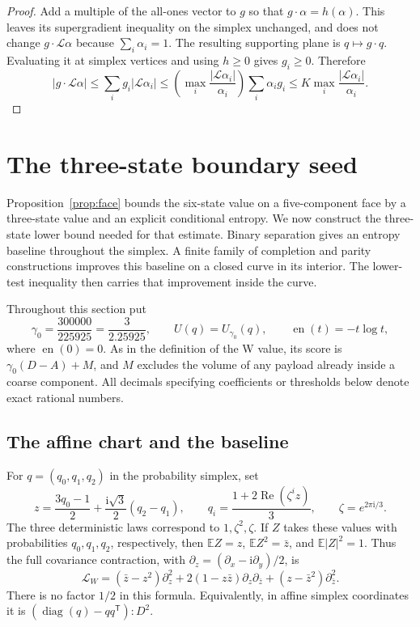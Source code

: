 \documentclass[11pt]{article}
\numberwithin{equation}{section}
\theoremstyle{definition}
\theoremstyle{remark}
\begin{document}
\begin{proof}
Add a multiple of the all-ones vector to \(g\) so that
\(g\cdot\alpha=h(\alpha)\).  This leaves its supergradient inequality
on the simplex unchanged, and does not change \(g\cdot\mathcal L\alpha\)
because \(\sum_i\alpha_i=1\).  The resulting supporting plane is
\(q\mapsto g\cdot q\).  Evaluating it at simplex vertices and using
\(h\geq0\) gives \(g_i\geq0\).  Therefore
\[
 |g\cdot\mathcal L\alpha|
 \leq\sum_i g_i|\mathcal L\alpha_i|
 \leq\left(\max_i\frac{|\mathcal L\alpha_i|}{\alpha_i}\right)
       \sum_i\alpha_i g_i
 \leq K\max_i\frac{|\mathcal L\alpha_i|}{\alpha_i}.
\]
\end{proof}

\section{The three-state boundary seed}
\label{cert:w-seed-section}

Proposition~\ref{prop:face} bounds the six-state value on a five-component
face by a three-state value and an explicit conditional entropy.  We now
construct the three-state lower bound needed for that estimate.
Binary separation gives an entropy baseline throughout the simplex.
A finite family of completion and parity constructions improves this baseline
on a closed curve in its interior.  The lower-test inequality then carries
that improvement inside the curve.

Throughout this section put
\[
 \gamma _0=\frac{300000}{225925}=\frac3{2.25925},\qquad
 U(q)=U_{\gamma _0}(q),\qquad \operatorname{en}(t)=-t\log t,
\]
where $\operatorname{en}(0)=0$.  As in the definition of the W value, its score is
$\gamma _0(D-A)+M$, and $M$ excludes the volume of any payload already
inside a coarse component.  All decimals specifying coefficients or
thresholds below denote exact rational numbers.

\subsection{The affine chart and the baseline}

For $q=(q_0,q_1,q_2)$ in the probability simplex, set
\begin{equation}
 z=\frac{3q_0-1}{2}+\frac{\mathrm i\sqrt3}{2}(q_2-q_1),
 \qquad
 q_i=\frac{1+2\operatorname{Re}(\zeta^i z)}3,
 \qquad \zeta=e^{2\pi\mathrm i/3}.
 \label{cert:w-coordinate}
\end{equation}
The three deterministic laws correspond to $1,\zeta^2,\zeta$.
If $Z$ takes these values with probabilities $q_0,q_1,q_2$, respectively,
then $\mathbb E Z=z$, $\mathbb E Z^2=\bar z$, and $\mathbb E|Z|^2=1$.  Thus the full
covariance contraction, with $\partial_z=(\partial_x-\mathrm i\partial_y)/2$,
is
\begin{equation}
 \mathcal L_W
 = (\bar z-z^2)\partial_z^2
   +2(1-z\bar z)\partial_z\partial_{\bar z}
   +(z-\bar z^2)\partial_{\bar z}^2.
 \label{cert:w-operator}
\end{equation}
There is no factor $1/2$ in this formula.  Equivalently, in affine simplex
coordinates it is $(\operatorname{diag}(q)-qq^{\mathsf T}):D^2$.
\end{document}
